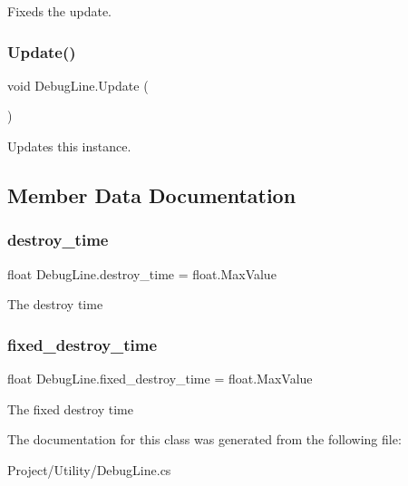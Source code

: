 Fixeds the update. 

\mbox{\label{class_debug_line_abe4fa3efa236e9da37c69612e22fc41e}} 
\subsubsection{\texorpdfstring{Update()}{Update()}}
{\footnotesize\ttfamily void Debug\+Line.\+Update (\begin{DoxyParamCaption}{ }\end{DoxyParamCaption})\hspace{0.3cm}{\ttfamily [inline]}}



Updates this instance. 



\subsection{Member Data Documentation}
\mbox{\label{class_debug_line_a8dd338f42279db7c3021db91b404d7d7}} 
\subsubsection{\texorpdfstring{destroy\+\_\+time}{destroy\_time}}
{\footnotesize\ttfamily float Debug\+Line.\+destroy\+\_\+time = float.\+Max\+Value}



The destroy time 

\mbox{\label{class_debug_line_ad00e7c895184364d924545e9e48780a4}} 
\subsubsection{\texorpdfstring{fixed\+\_\+destroy\+\_\+time}{fixed\_destroy\_time}}
{\footnotesize\ttfamily float Debug\+Line.\+fixed\+\_\+destroy\+\_\+time = float.\+Max\+Value}



The fixed destroy time 



The documentation for this class was generated from the following file\+:\begin{DoxyCompactItemize}
\item 
Project/\+Utility/Debug\+Line.\+cs\end{DoxyCompactItemize}
